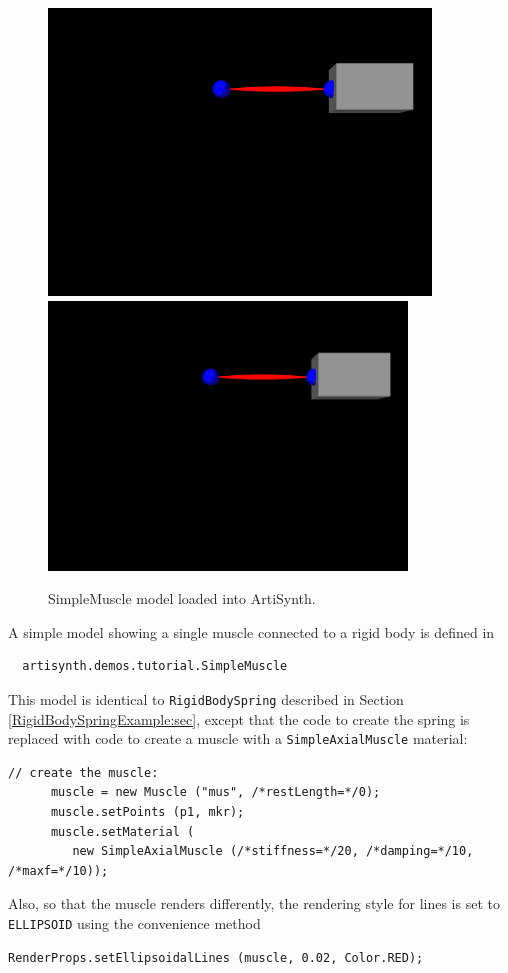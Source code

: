 \begin{figure}[ht]
\begin{center}
\iflatexml
 \includegraphics[]{images/SimpleMuscle}
\else
 \includegraphics[width=3.75in]{images/SimpleMuscle}
\fi
\end{center}
\caption{SimpleMuscle model loaded into ArtiSynth.}
\label{SimpleMuscle:fig}
\end{figure}

A simple model showing a single muscle connected to a rigid
body is defined in
%
\begin{verbatim}
  artisynth.demos.tutorial.SimpleMuscle
\end{verbatim}
%

This model is identical to {\tt RigidBodySpring} described in Section
\ref{RigidBodySpringExample:sec}, except that the code to create
the spring is replaced with code to create a muscle
with a {\tt SimpleAxialMuscle} material:
%
\begin{lstlisting}[]
      // create the muscle:      
      muscle = new Muscle ("mus", /*restLength=*/0);
      muscle.setPoints (p1, mkr);
      muscle.setMaterial (
         new SimpleAxialMuscle (/*stiffness=*/20, /*damping=*/10, /*maxf=*/10));
\end{lstlisting}
%
Also, so that the muscle renders differently, the rendering style
for lines is set to {\tt ELLIPSOID} using the convenience method
%
\begin{lstlisting}[]
      RenderProps.setEllipsoidalLines (muscle, 0.02, Color.RED);
\end{lstlisting}
%

